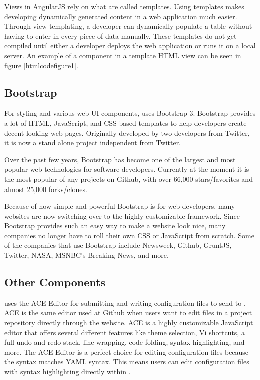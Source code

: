 Views in AngularJS rely on what are called templates. Using templates makes developing dynamically generated content in a web application much easier. Through view templating, a developer can dynamically populate a table without having to enter in every piece of data manually. These templates do not get compiled until either a developer deploys the web application or runs it on a local server. An example of a component in a template HTML view can be seen in figure \ref{htmlcodefigure1}.

\subsection{Bootstrap}

For styling and various web UI components, \projectName{} uses Bootstrap 3\cite{Note:Bootstrap:2014}. Bootstrap provides a lot of HTML, JavaScript, and CSS based templates to help developers create decent looking web pages. Originally developed by two developers from Twitter, it is now a stand alone project independent from Twitter.

Over the past few years, Bootstrap has become one of the largest and most popular web technologies for software developers. Currently at the moment it is the most popular of any projects on Github, with over 66,000 stars/favorites and almost 25,000 forks/clones\cite{Note:GithubStars:2014}.

Because of how simple and powerful Bootstrap is for web developers, many websites are now switching over to the highly customizable framework. Since Bootstrap provides such an easy way to make a website look nice, many companies no longer have to roll their own CSS or JavaScript from scratch. Some of the companies that use Bootstrap include Newsweek, Github, GruntJS, Twitter, NASA, MSNBC's Breaking News, and more\cite{Note:Bootstrap:2014}.

\subsection{Other Components}

\projectName{} uses the ACE Editor\cite{Note:ACE:2014} for submitting and writing configuration files to send to \ancor{}. ACE is the same editor used at Github when users want to edit files in a project repository directly through the website. ACE is a highly customizable JavaScript editor that offers several different features like theme selection, Vi shortcuts, a full undo and redo stack, line wrapping, code folding, syntax highlighting, and more. The ACE Editor is a perfect choice for editing configuration files because the syntax matches YAML syntax. This means users can edit configuration files with syntax highlighting directly within \projectName{}.

